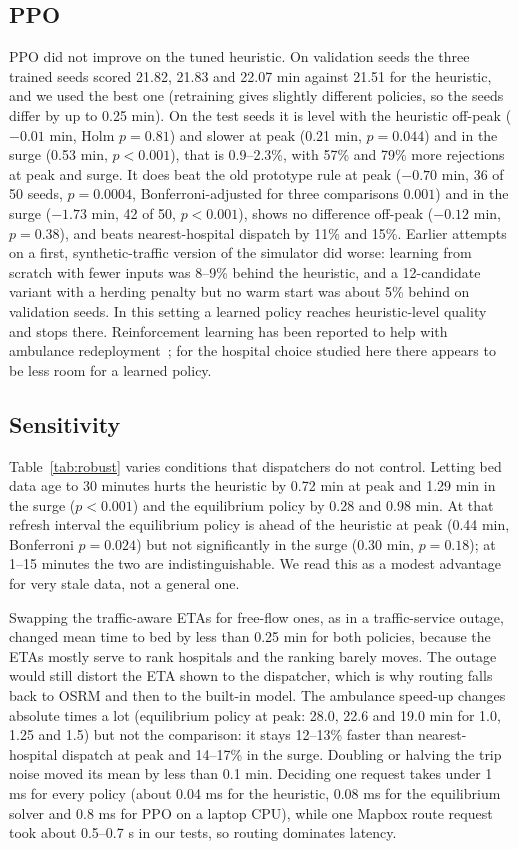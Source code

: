 \documentclass[conference]{IEEEtran}
\begin{document}
\subsection{PPO}
PPO did not improve on the tuned heuristic. On validation seeds the three trained seeds scored 21.82, 21.83 and 22.07 min against 21.51 for the heuristic, and we used the best one (retraining gives slightly different policies, so the seeds differ by up to 0.25 min). On the test seeds it is level with the heuristic off-peak ($-0.01$ min, Holm $p=0.81$) and slower at peak (0.21 min, $p=0.044$) and in the surge (0.53 min, $p<0.001$), that is 0.9--2.3\%, with 57\% and 79\% more rejections at peak and surge. It does beat the old prototype rule at peak ($-0.70$ min, 36 of 50 seeds, $p=0.0004$, Bonferroni-adjusted for three comparisons $0.001$) and in the surge ($-1.73$ min, 42 of 50, $p<0.001$), shows no difference off-peak ($-0.12$ min, $p=0.38$), and beats nearest-hospital dispatch by 11\% and 15\%. Earlier attempts on a first, synthetic-traffic version of the simulator did worse: learning from scratch with fewer inputs was 8--9\% behind the heuristic, and a 12-candidate variant with a herding penalty but no warm start was about 5\% behind on validation seeds. In this setting a learned policy reaches heuristic-level quality and stops there. Reinforcement learning has been reported to help with ambulance redeployment~\cite{tluli2024dynamic}; for the hospital choice studied here there appears to be less room for a learned policy.

\subsection{Sensitivity}
Table~\ref{tab:robust} varies conditions that dispatchers do not control. Letting bed data age to 30 minutes hurts the heuristic by 0.72 min at peak and 1.29 min in the surge ($p<0.001$) and the equilibrium policy by 0.28 and 0.98 min. At that refresh interval the equilibrium policy is ahead of the heuristic at peak (0.44 min, Bonferroni $p=0.024$) but not significantly in the surge (0.30 min, $p=0.18$); at 1--15 minutes the two are indistinguishable. We read this as a modest advantage for very stale data, not a general one.

Swapping the traffic-aware ETAs for free-flow ones, as in a traffic-service outage, changed mean time to bed by less than 0.25 min for both policies, because the ETAs mostly serve to rank hospitals and the ranking barely moves. The outage would still distort the ETA shown to the dispatcher, which is why routing falls back to OSRM and then to the built-in model. The ambulance speed-up changes absolute times a lot (equilibrium policy at peak: 28.0, 22.6 and 19.0 min for 1.0, 1.25 and 1.5) but not the comparison: it stays 12--13\% faster than nearest-hospital dispatch at peak and 14--17\% in the surge. Doubling or halving the trip noise moved its mean by less than 0.1 min. Deciding one request takes under 1 ms for every policy (about 0.04 ms for the heuristic, 0.08 ms for the equilibrium solver and 0.8 ms for PPO on a laptop CPU), while one Mapbox route request took about 0.5--0.7 s in our tests, so routing dominates latency.
\end{document}
